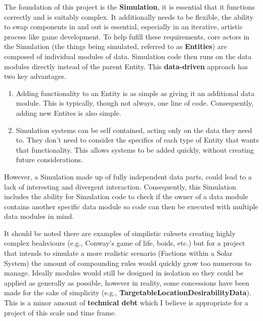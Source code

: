 \documentclass{report}
\begin{document}
The foundation of this project is the \textbf{Simulation}, it is essential that it functions correctly and is suitably complex. It additionally needs to be flexible, the ability to swap components in and out is essential, especially in an iterative, artistic process like game development. To help fufill these requirements, core actors in the Simulation (the things being simulated, referred to as \textbf{Entities}) are composed of individual modules of data. Simulation code then runs on the data modules directly instead of the parent Entity. This \textbf{data-driven} approach has two key advantages.

\begin{enumerate}

	\item Adding functionality to an Entity is as simple as giving it an additional data module. This is typically, though not always, one line of code. Consequently, adding new Entites is also simple.

	\item Simulation systems can be self contained, acting only on the data they need to. They don't need to consider the specifics of each type of Entity that wants that functionality. This allows systems to be added quickly, without creating future considerations.

\end{enumerate}

However, a Simulation made up of fully independent data parts, could lead to a lack of interesting and divergent interaction. Consequently, this Simulation includes the ability for Simulation code to check if the owner of a data module contains another specific data module so code can then be executed with multiple data modules in mind. 

It should be noted there are examples of simplistic rulesets creating highly complex beahviours (e.g., Conway's game of life, boids, etc.) but for a project that intends to simulate a more realistic scenario (Factions within a Solar System) the amount of compounding rules would quickly grow too numerous to manage. Ideally modules would still be designed in isolation so they could be applied as generally as possible, however in reality, some concessions have been made for the sake of simplicity (e.g., \textbf{TargetableLocationDesirabilityData}). This is a minor amount of \textbf{technical debt} which I believe is appropriate for a project of this scale and time frame.
\end{document}
